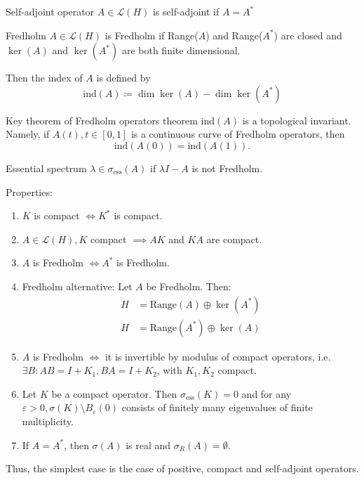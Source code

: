 \documentclass{report}
\begin{document}
\begin{definition}{Self-adjoint operator}{}
    \(A \in \mathcal{L}(H)\) is self-adjoint if \(A = A^{*}\) 
\end{definition}

\begin{definition}{Fredholm}{}
    \(A \in \mathcal{L}(H)\) is Fredholm if Range(\(A\)) and Range(\(A^{*}\)) are closed and \(\ker(A)\) and \(\ker(A^{*})\) are both finite dimensional.

    Then the index of \(A\) is defined by 
    \[
        \text{ind}(A) \coloneqq \dim \ker(A) - \dim \ker(A^{*})
    \]
\end{definition}

\begin{theorem}{Key theorem of Fredholm operators theorem}{}
    \(\text{ind}(A)\) is a topological invariant. Namely, if \(A(t), t \in [0, 1]\) is a continuous curve of Fredholm operators, then 
    \[
        \text{ind}(A(0)) = \text{ind}(A(1)).
    \]
\end{theorem}

\begin{definition}{Essential spectrum}{}
    \(\lambda \in \sigma_{\text{ess}}(A)\) if \(\lambda I - A\) is not Fredholm.
\end{definition}

Properties:
\begin{enumerate}
    \item \(K\) is compact \(\iff K^{*}\) is compact.
    \item \(A \in \mathcal{L}(H), K \) compact \(\implies AK\) and \(KA\) are compact.
    \item \(A\) is Fredholm \(\iff A^{*}\) is Fredholm.
    \item Fredholm alternative: Let \(A\) be Fredholm. Then:
    \begin{align*}
        H &= \text{Range}(A) \oplus \ker(A^{*}) \\
        H &= \text{Range}(A^{*}) \oplus \ker(A)
    \end{align*}
    \item \(A\) is Fredholm \(\iff\) it is invertible by modulus of compact operators, i.e. \(\exists B : AB = I + K_{1}, BA = I + K_{2}\), with \(K_1, K_2\) compact.
    \item Let \(K\) be a compact operator. Then \(\sigma_{\text{ess}}(K) = 0\) and for any \(\varepsilon > 0, \sigma(K) \setminus B_{\varepsilon}(0)\) consists of finitely many eigenvalues of finite multiplicity.
    \item If \(A = A^{*}\), then \(\sigma(A)\) is real and \(\sigma_{R}(A) = \emptyset\).
\end{enumerate}
Thus, the simplest case is the case of positive, compact and self-adjoint operators.
\end{document}
